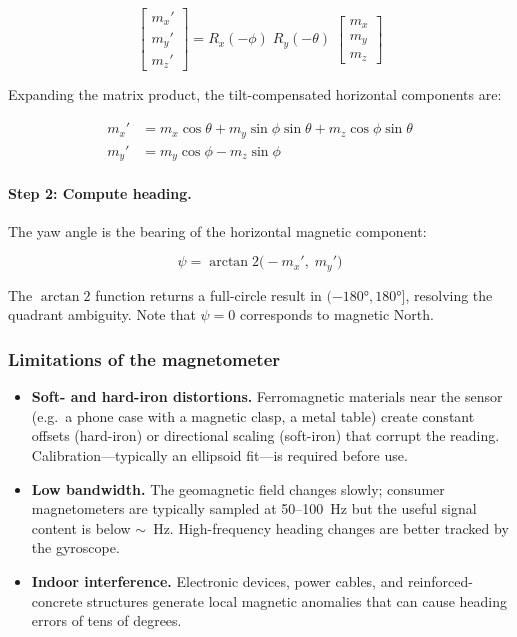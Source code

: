 \begin{equation}
  \begin{bmatrix} m_x' \\ m_y' \\ m_z' \end{bmatrix}
  = R_x(-\phi)\;R_y(-\theta)\;
  \begin{bmatrix} m_x \\ m_y \\ m_z \end{bmatrix}
  \label{eq:tilt_compensation}
\end{equation}

\noindent Expanding the matrix product, the tilt-compensated horizontal
components are:

\begin{align}
  m_x' &= m_x\cos\theta + m_y\sin\phi\sin\theta
         + m_z\cos\phi\sin\theta
  \label{eq:mx_comp} \\[4pt]
  m_y' &= m_y\cos\phi - m_z\sin\phi
  \label{eq:my_comp}
\end{align}

\paragraph{Step 2: Compute heading.}
The yaw angle is the bearing of the horizontal magnetic component:

\begin{equation}
  \boxed{\;\psi = \arctan2\!\bigl(-m_x',\; m_y'\bigr)\;}
  \label{eq:yaw_mag}
\end{equation}

\noindent The $\arctan2$ function returns a full-circle result in
$(-180°, 180°]$, resolving the quadrant ambiguity. Note that
$\psi = 0$ corresponds to magnetic North.

\subsubsection{Limitations of the magnetometer}
\label{sec:frames:mag:limitations}

\begin{itemize}
  \item \textbf{Soft- and hard-iron distortions.} Ferromagnetic materials
        near the sensor (e.g.\ a phone case with a magnetic clasp, a metal
        table) create constant offsets (hard-iron) or directional scaling
        (soft-iron) that corrupt the reading. Calibration---typically an
        ellipsoid fit---is required before use.
  \item \textbf{Low bandwidth.} The geomagnetic field changes slowly;
        consumer magnetometers are typically sampled at 50--100~Hz but the
        useful signal content is below $\sim$~Hz. High-frequency heading
        changes are better tracked by the gyroscope.
  \item \textbf{Indoor interference.} Electronic devices, power cables, and
        reinforced-concrete structures generate local magnetic anomalies that
        can cause heading errors of tens of degrees.
\end{itemize}

